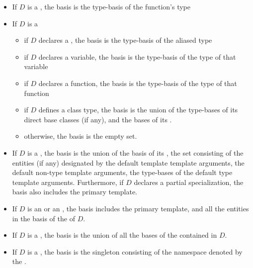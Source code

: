 \begin{std.txt}
\begin{itemize}
\begin{itemize}
        \item otherwise, the basis is empty.
    \end{itemize}

    \item If $D$ is a , the basis is
    the type-basis of the function's type

    \item If $D$ is a 
    \begin{itemize}
        \item if $D$ declares a , the basis is the
        type-basis of the aliased type
        \item if $D$ declares a variable, the basis is the type-basis
         of the type of that variable
         \item if $D$ declares a function, the basis is the type-basis of the type of that function
         \item if $D$ defines a class type, the basis is the union of the
         type-bases of its direct base classes (if any), and the bases of
         its .
         \item otherwise, the basis is the empty set.
    \end{itemize}

    \item If $D$ is a , the basis is the union
    of the basis of its , the set
    consisting of the entities (if any) designated by the default
    template template arguments, the default non-type template arguments, the
    type-bases of the default type template arguments.
    Furthermore, if $D$ declares a
    partial specialization, the basis also includes the primary template.

    \item If $D$ is  an 
    or an , the basis includes
    the primary template, and all the entities in the basis of the 
     of $D$.

    \item If $D$ is a , the basis is the union
    of all the bases of the  contained in $D$.

    \item If $D$ is a , the basis is the 
    singleton consisting of the namespace denoted by the
    .


\end{itemize}
\end{std.txt}
